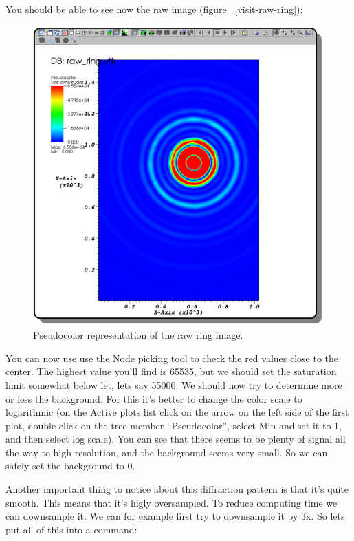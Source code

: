 \documentclass{report}
\begin{document}
You should be able to see now the raw image (figure ~\ref{visit-raw-ring}):

\begin{figure}[htp]
\centering
\includegraphics[scale=0.4]{visit_raw_ring.png}
\caption{Pseudocolor representation of the raw ring image.}
\label{ring-mask}
\end{figure}

You can now use use the Node picking tool to check the red values close to the center. The highest value you'll
find is 65535, but we should set the saturation limit somewhat below let, lets say 55000.
We should now try to determine more or less the background. For this it's better to change the color scale to 
logarithmic (on the Active plots list click on the arrow on the left side of the first plot, double click  on
the tree member ``Pseudocolor'', select Min and set it to 1, and then select log scale).
You can see that there seems to be plenty of signal all the way to high resolution, and the background seems
very small. So we can safely set the background to 0. 


Another important thing to notice about this diffraction pattern is that it's quite smooth. This means that it's
higly oversampled. To reduce computing time we can downsample it. We can for example first try to downsample it by
3x. So lets put all of this into a command:
\end{document}
